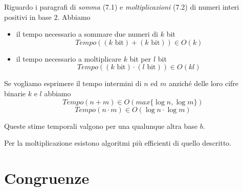 \documentclass[a4paper,12pt, oneside]{book}
\begin{document}
		\begin{esempio}
			Riguardo i paragrafi di \textit{somma} (7.1) e \textit{moltiplicazioni} (7.2) di numeri interi positivi in base $2$. Abbiamo \begin{itemize}
				\item il tempo necessario a sommare due numeri di $k$ bit
				$$Tempo((k \mbox{ bit}) + (k \mbox{ bit})) \in O(k)$$
				\item il tempo necessario a moltiplicare $k$ bit per $l$ bit
				$$Tempo((k \mbox{ bit}) \cdot (l \mbox{ bit})) \in O(kl)$$
			\end{itemize}
			Se vogliamo esprimere il tempo intermini di $n$ ed $m$ anziché delle loro cifre binarie $k$ e $l$ abbiamo
			$$Tempo(n+m) \in O(max\{\log n,\log m\})$$
			$$Tempo(n\cdot m) \in O(\log n \cdot \log m)$$
			\begin{nota}
				Queste stime temporali valgono per una qualunque altra base $b$.
			\end{nota}
			\begin{nota}
				Per la moltiplicazione esistono algoritmi più efficienti di quello descritto.
			\end{nota}
		\end{esempio}
		
\chapter{Congruenze}
\end{document}
